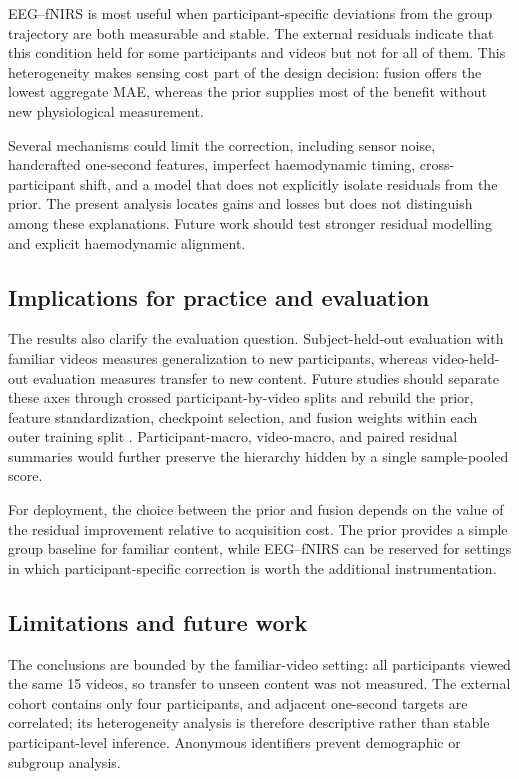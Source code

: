 EEG--fNIRS is most useful when participant-specific deviations from the group
trajectory are both measurable and stable. The external residuals indicate
that this condition held for some participants and videos but not for all of
them. This heterogeneity makes sensing cost part of the design decision:
fusion offers the lowest aggregate MAE, whereas the prior supplies most of the
benefit without new physiological measurement.

Several mechanisms could limit the correction, including sensor noise,
handcrafted one-second features, imperfect haemodynamic timing,
cross-participant shift, and a model that does not explicitly isolate residuals
from the prior. The present analysis locates gains and losses but does not
distinguish among these explanations. Future work should test stronger residual
modelling and explicit haemodynamic alignment.

\subsection{Implications for practice and evaluation}

The results also clarify the evaluation question. Subject-held-out evaluation
with familiar videos measures generalization to new participants, whereas
video-held-out evaluation measures transfer to new content. Future studies
should separate these axes through crossed participant-by-video splits and
rebuild the prior, feature standardization, checkpoint selection, and fusion
weights within each outer training split
\cite{varma2006bias,varoquaux2017decoders}. Participant-macro, video-macro, and
paired residual summaries would further preserve the hierarchy hidden by a
single sample-pooled score.

For deployment, the choice between the prior and fusion depends on the value of
the residual improvement relative to acquisition cost. The prior provides a
simple group baseline for familiar content, while EEG--fNIRS can be reserved
for settings in which participant-specific correction is worth the additional
instrumentation.

\subsection{Limitations and future work}

The conclusions are bounded by the familiar-video setting: all participants
viewed the same 15 videos, so transfer to unseen content was not measured. The
external cohort contains only four participants, and adjacent one-second
targets are correlated; its heterogeneity analysis is therefore descriptive
rather than stable participant-level inference. Anonymous identifiers prevent
demographic or subgroup analysis.

